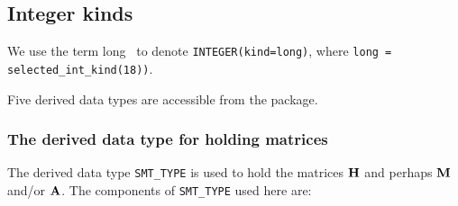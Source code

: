 \documentclass{galahad}
\begin{document}

\subsection{Integer kinds}\label{Integer kinds}
We use the term
long \integer\ to denote {\tt INTEGER\-(kind=long)}, where
{\tt long = selected\_int\_kind(18))}.





\galtypes
Five derived data types are accessible from the package.


\subsubsection{The derived data type for holding matrices}\label{typesmt}
The derived data type {\tt SMT\_TYPE} is used to hold the matrices ${\mathbf{H}}$
and perhaps ${\mathbf{M}}$ and/or ${\mathbf{A}}$.
The components of {\tt SMT\_TYPE} used here are:
\end{document}
